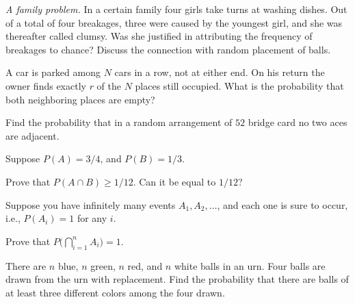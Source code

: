 \begin{problem}
  \emph{A family problem.} In a certain family four girls take turns at
  washing dishes. Out of a total of four breakages, three were caused by
  the youngest girl, and she was thereafter called clumsy. Was she
  justified in attributing the frequency of breakages to chance? Discuss
  the connection with random placement of balls.
\end{problem}
\begin{solution}

\end{solution}
\newpage

\begin{problem}
  A car is parked among \(N\) cars in a row, not at either end. On his
  return the owner finds exactly \(r\) of the \(N\) places still
  occupied. What is the probability that both neighboring places are empty?
\end{problem}
\begin{solution}

\end{solution}
\newpage

\begin{problem}
  Find the probability that in a random arrangement of \(52\) bridge card
  no two aces are adjacent.
\end{problem}
\begin{solution}

\end{solution}
\newpage

\begin{problem}
  Suppose \(P(A)=3/4\), and \(P(B)=1/3\).

  Prove that \(P(A\cap B)\geq 1/12\). Can it be equal to \(1/12\)?
\end{problem}
\begin{solution}

\end{solution}
\newpage

\begin{problem}
  Suppose you have infinitely many events \(A_1,A_2,\dotsc\), and each one
  is sure to occur, i.e., \(P(A_i)=1\) for any \(i\).

  Prove that \(P\bigl(\bigcap_{i=1}^n A_i\bigr)=1\).
\end{problem}
\begin{solution}

\end{solution}
\newpage

\begin{problem}
  There are \(n\) blue, \(n\) green, \(n\) red, and \(n\) white balls in an
  urn. Four balls are drawn from the urn with replacement. Find the
  probability that there are balls of at least three different colors among
  the four drawn.
\end{problem}
\begin{solution}

\end{solution}

